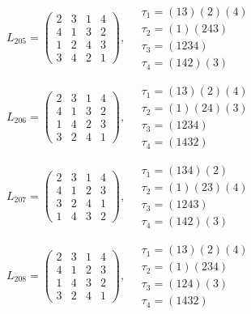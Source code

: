 $L_{205} = \begin{pmatrix} 2 & 3 & 1 & 4 \\ 4 & 1 & 3 & 2 \\ 1 & 2 & 4 & 3 \\ 3 & 4 & 2 & 1 \end{pmatrix}, \quad \begin{matrix} \tau_{1} = (1 3)(2)(4) \\ \tau_{2} = (1)(2 4 3) \\ \tau_{3} = (1 2 3 4) \\ \tau_{4} = (1 4 2)(3) \end{matrix}$

$L_{206} = \begin{pmatrix} 2 & 3 & 1 & 4 \\ 4 & 1 & 3 & 2 \\ 1 & 4 & 2 & 3 \\ 3 & 2 & 4 & 1 \end{pmatrix}, \quad \begin{matrix} \tau_{1} = (1 3)(2)(4) \\ \tau_{2} = (1)(2 4)(3) \\ \tau_{3} = (1 2 3 4) \\ \tau_{4} = (1 4 3 2) \end{matrix}$

$L_{207} = \begin{pmatrix} 2 & 3 & 1 & 4 \\ 4 & 1 & 2 & 3 \\ 3 & 2 & 4 & 1 \\ 1 & 4 & 3 & 2 \end{pmatrix}, \quad \begin{matrix} \tau_{1} = (1 3 4)(2) \\ \tau_{2} = (1)(2 3)(4) \\ \tau_{3} = (1 2 4 3) \\ \tau_{4} = (1 4 2)(3) \end{matrix}$

$L_{208} = \begin{pmatrix} 2 & 3 & 1 & 4 \\ 4 & 1 & 2 & 3 \\ 1 & 4 & 3 & 2 \\ 3 & 2 & 4 & 1 \end{pmatrix}, \quad \begin{matrix} \tau_{1} = (1 3)(2)(4) \\ \tau_{2} = (1)(2 3 4) \\ \tau_{3} = (1 2 4)(3) \\ \tau_{4} = (1 4 3 2) \end{matrix}$

